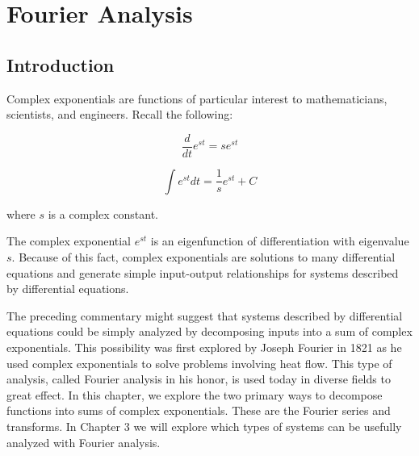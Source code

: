 \chapter{Fourier Analysis}

\section{Introduction}
Complex exponentials are functions of particular interest to mathematicians, scientists, and engineers. Recall the following:

\begin{equation}
	\frac{d}{dt} e^{st} = s e^{st}
\end{equation}

\begin{equation}
	\int e^{st} dt = \frac{1}{s} e^{st} + C
\end{equation}

where $s$ is a complex constant.

The complex exponential $e^{st}$ is an eigenfunction of differentiation with eigenvalue $s$. Because of this fact, complex exponentials are solutions to many differential equations and generate simple input-output relationships for systems described by differential equations.

The preceding commentary might suggest that systems described by differential equations could be simply analyzed by decomposing inputs into a sum of complex exponentials. This possibility was first explored by Joseph Fourier in 1821 as he used complex exponentials to solve problems involving heat flow. This type of analysis, called Fourier analysis in his honor, is used today in diverse fields to great effect.
In this chapter, we explore the two primary ways to decompose functions into sums of complex exponentials. These are the Fourier series and transforms. In Chapter 3 we will explore which types of systems can be usefully analyzed with Fourier analysis.
